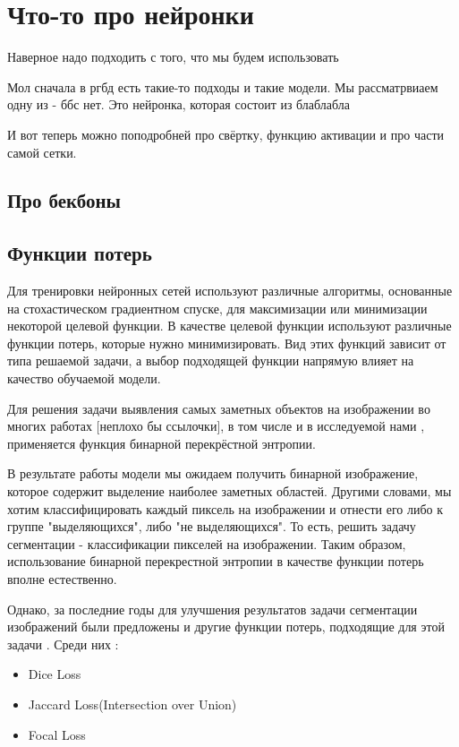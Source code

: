\section{Что-то про нейронки}

Наверное надо подходить с того, что мы будем использовать 

Мол сначала в ргбд есть такие-то подходы и такие модели. Мы рассматрвиаем одну из - ббс нет. Это нейронка, которая состоит из блаблабла

И вот теперь можно поподробней про свёртку, функцию активации и про части самой сетки.

\subsection{Про бекбоны}

\subsection{Функции потерь}

Для тренировки нейронных сетей используют различные алгоритмы, основанные на стохастическом градиентном спуске,
для максимизации или минимизации некоторой целевой функции. В качестве целевой функции используют различные функции потерь, 
которые нужно минимизировать. Вид этих функций зависит от типа решаемой задачи, а выбор подходящей функции напрямую влияет на 
качество обучаемой модели. 

Для решения задачи выявления самых заметных объектов на изображении 
во многих работах [неплохо бы ссылочки], в том числе и в исследуемой нами \cite{BBS}, применяется функция бинарной перекрёстной энтропии.

В результате работы модели мы ожидаем получить бинарной изображение, которое содержит выделение наиболее заметных областей. 
Другими словами, мы хотим классифицировать каждый пиксель на изображении и отнести его либо к группе "выделяющихся", либо "не выделяющихся". То есть,
решить задачу сегментации - классификации пикселей на изображении. Таким образом, использование бинарной перекрестной энтропии 
в качестве функции потерь вполне естественно.

Однако, за последние годы для улучшения результатов задачи сегментации изображений были предложены и другие функции потерь, подходящие для 
этой задачи \cite{Loss-Functions}. Среди них : 

\begin{itemize}
    \item Dice Loss \cite{Dice-Loss}
    \item Jaccard Loss(Intersection over Union) \cite{IoU-Loss}
    \item Focal Loss \cite{Focal-Loss}
\end{itemize}

